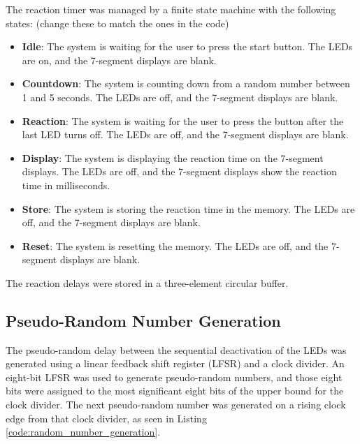 \documentclass[12pt]{article}
\begin{document}
The reaction timer was managed by a finite state machine with the following states: (change these to match the ones in the code)
\begin{itemize}
    \item \textbf{Idle}: The system is waiting for the user to press the start button. The LEDs are on, and the 7-segment displays are blank.
    \item \textbf{Countdown}: The system is counting down from a random number between 1 and 5 seconds. The LEDs are off, and the 7-segment displays are blank.
    \item \textbf{Reaction}: The system is waiting for the user to press the button after the last LED turns off. The LEDs are off, and the 7-segment displays are blank.
    \item \textbf{Display}: The system is displaying the reaction time on the 7-segment displays. The LEDs are off, and the 7-segment displays show the reaction time in milliseconds.
    \item \textbf{Store}: The system is storing the reaction time in the memory. The LEDs are off, and the 7-segment displays are blank.
    \item \textbf{Reset}: The system is resetting the memory. The LEDs are off, and the 7-segment displays are blank.
\end{itemize}

The reaction delays were stored in a three-element circular buffer.

\subsection{Pseudo-Random Number Generation}

The pseudo-random delay between the sequential deactivation of the LEDs was generated using a linear feedback shift register (LFSR) and a clock divider. An eight-bit LFSR was used to generate pseudo-random numbers, and those eight bits were assigned to the most significant eight bits of the upper bound for the clock divider. The next pseudo-random number was generated on a rising clock edge from that clock divider, as seen in Listing \ref{code:random_number_generation}.
\end{document}
